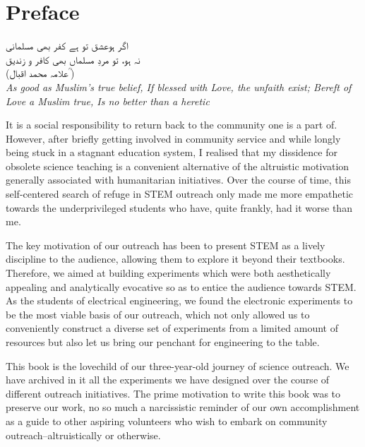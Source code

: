 \chapter*{Preface}

\begin{center}
\texturdu
{
اگر ہوعشق تو ہے کفر بھی مسلمانی\\
نہ ہو، تو مردِ مسلماں بھی کافر و زندیق\\\hspace{6cm}
(علامہ محمد اقبال ؒ)
}
\\[3mm]
{\small\textit{As good as Muslim’s true belief, If blessed with Love, the unfaith exist; Bereft of Love a Muslim true, Is no better than a heretic}}
\end{center}

\vspace{7mm}

It is a social responsibility to return back to the community one is a part of. However, after briefly getting involved in community service and while longly being stuck in a stagnant education system, I realised that my dissidence for obsolete science teaching is a convenient alternative of the altruistic motivation generally associated with humanitarian initiatives. Over the course of time, this self-centered search of refuge in STEM outreach only made me more empathetic towards the underprivileged students who have, quite frankly, had it worse than me.

 The key motivation of our outreach has been to present STEM as a lively discipline to the audience, allowing them to explore it beyond their textbooks. Therefore, we aimed at building experiments which were both aesthetically appealing and analytically evocative so as to entice the audience towards STEM. As the students of electrical engineering, we found the electronic experiments to be the most viable basis of our outreach, which not only allowed us to conveniently construct a diverse set of experiments from a limited amount of resources but also let us bring our penchant for engineering to the table.
 
 This book is the lovechild of our three-year-old journey of science outreach. We have archived in it all the experiments we have designed over the course of different outreach initiatives. The prime motivation to write this book was to preserve our work, no so much a narcissistic reminder of our own accomplishment as a guide to other aspiring volunteers who wish to embark on community outreach--altruistically or otherwise.   

